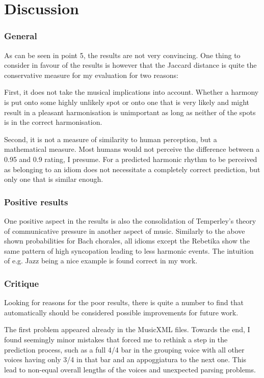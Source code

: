 \documentclass[a4paper,12pt]{report}
\begin{document}
\chapter{Discussion}
\subsection{General}
As can be seen in point 5, the results are not very convincing. One thing to consider in favour of the results is however that the Jaccard distance is quite the conservative measure for my evaluation for two reasons:

First, it does not take the musical implications into account. Whether a harmony is put onto some highly unlikely spot or onto one that is very likely and might result in a pleasant harmonisation is unimportant as long as neither of the spots is in the correct harmonisation.

Second, it is not a measure of similarity to human perception, but a mathematical measure. Most humans would not perceive the difference between a 0.95 and 0.9 rating, I presume. For a predicted harmonic rhythm to be perceived as belonging to an idiom does not necessitate a completely correct prediction, but only one that is similar enough.

\subsection{Positive results}
One positive aspect in the results is also the consolidation of Temperley's theory of communicative pressure in another aspect of music. Similarly to the above shown probabilities for Bach chorales, all idioms except the Rebetika show the same pattern of high syncopation leading to less harmonic events. The intuition of e.g. Jazz being a nice example is found correct in my work.
\vspace{1ex}

\subsection{Critique}
Looking for reasons for the poor results, there is quite a number to find that automatically should be considered possible improvements for future work.

The first problem appeared already in the MusicXML files. Towards the end, I found seemingly minor mistakes that forced me to rethink a step in the prediction process, such as a full 4/4 bar in the grouping voice with all other voices having only 3/4 in that bar and an appoggiatura to the next one. This lead to non-equal overall lengths of the voices and unexpected parsing problems.
\end{document}
